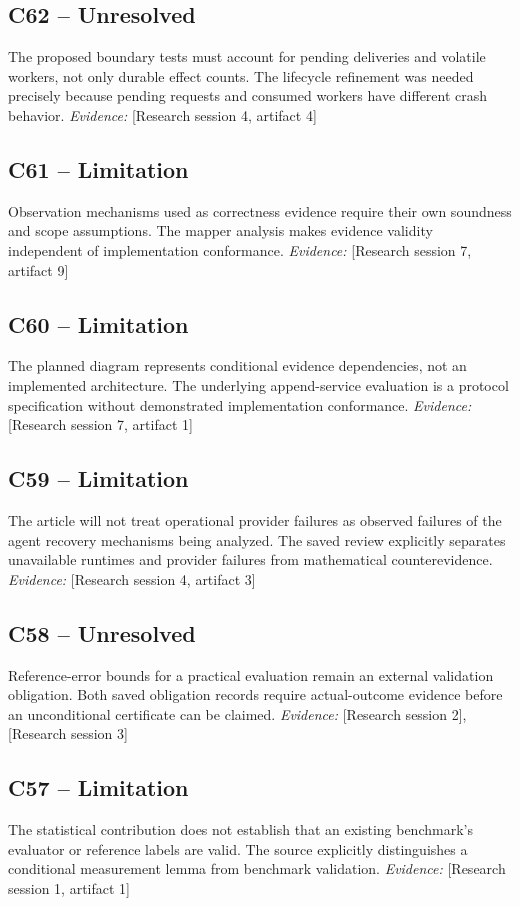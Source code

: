 \documentclass[11pt]{article}
\begin{document}
\begin{sloppypar}
\subsection{C62 -- Unresolved}
The proposed boundary tests must account for pending deliveries and volatile workers, not only durable effect counts.
The lifecycle refinement was needed precisely because pending requests and consumed workers have different crash behavior.
\textit{Evidence: }[Research session 4, artifact 4]
\subsection{C61 -- Limitation}
Observation mechanisms used as correctness evidence require their own soundness and scope assumptions.
The mapper analysis makes evidence validity independent of implementation conformance.
\textit{Evidence: }[Research session 7, artifact 9]
\subsection{C60 -- Limitation}
The planned diagram represents conditional evidence dependencies, not an implemented architecture.
The underlying append-service evaluation is a protocol specification without demonstrated implementation conformance.
\textit{Evidence: }[Research session 7, artifact 1]
\subsection{C59 -- Limitation}
The article will not treat operational provider failures as observed failures of the agent recovery mechanisms being analyzed.
The saved review explicitly separates unavailable runtimes and provider failures from mathematical counterevidence.
\textit{Evidence: }[Research session 4, artifact 3]
\subsection{C58 -- Unresolved}
Reference-error bounds for a practical evaluation remain an external validation obligation.
Both saved obligation records require actual-outcome evidence before an unconditional certificate can be claimed.
\textit{Evidence: }[Research session 2], [Research session 3]
\subsection{C57 -- Limitation}
The statistical contribution does not establish that an existing benchmark's evaluator or reference labels are valid.
The source explicitly distinguishes a conditional measurement lemma from benchmark validation.
\textit{Evidence: }[Research session 1, artifact 1]

\end{sloppypar}
\end{document}
